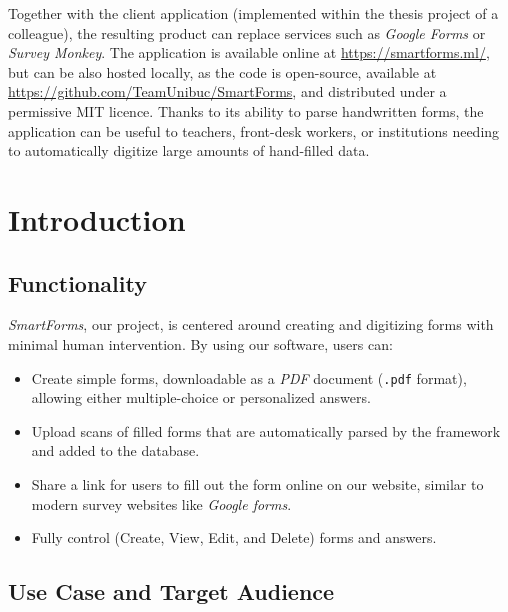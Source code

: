 \documentclass[11pt, a4paper]{report}
\newenvironment{abstractpage}
  {\cleardoublepage\vspace*{\fill}\thispagestyle{empty}}
  {\vfill\cleardoublepage}
\renewenvironment{abstract}[1]
  {\bigskip
  \begin{center}\bfseries\abstractname\end{center}}
  {\par\bigskip}
\def\code#1{\texttt{#1}}
\begin{document}
\begin{abstractpage}
\begin{abstract}{}
  Together with the client application (implemented within the thesis project of a colleague), the resulting product can replace services such as \textit{Google Forms} or \textit{Survey Monkey}. The application is available online at \url{https://smartforms.ml/}, but can be also hosted locally, as the code is open-source, available at \url{https://github.com/TeamUnibuc/SmartForms}, and distributed under a permissive MIT licence. Thanks to its ability to parse handwritten forms, the application can be useful to teachers, front-desk workers, or institutions needing to automatically digitize large amounts of hand-filled data. 
  
  \end{abstract}
  
\end{abstractpage}

\tableofcontents

\cleardoublepage
\pagestyle{main}
\let\ps@plain\ps@main


\chapter{Introduction}
\label{chapter-introduction}

\section{Functionality}

\textit{SmartForms}, our project, is centered around creating and digitizing forms with minimal human intervention. By using our software, users can:
\begin{itemize}
    \item Create simple forms, downloadable as a \textit{PDF} document (\code{.pdf} format), allowing either multiple-choice or personalized answers.
    \item Upload scans of filled forms that are automatically parsed by the framework and added to the database.
    \item Share a link for users to fill out the form online on our website, similar to modern survey websites like \textit{Google forms}.
    \item Fully control (Create, View, Edit, and Delete) forms and answers.
\end{itemize}

\section{Use Case and Target Audience}
\end{document}
